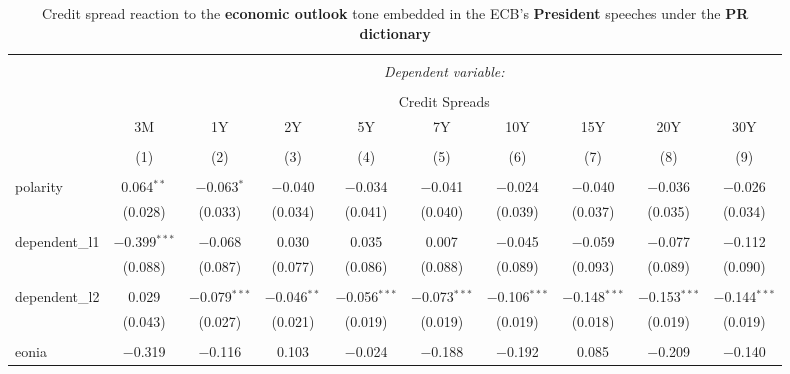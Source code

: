 
\begin{table}[!htbp] \centering 
  \caption[PR Economic Outlook Tone \& Credit Spread: president speeches]{Credit spread reaction to the \textbf{economic outlook} tone embedded in the ECB's \textbf{President} speeches under the \textbf{PR dictionary}} 
  \label{tab:spreads_president_pr_ec} 
  \begin{adjustbox}{width=1.25\textwidth}
\begin{tabular}{@{\extracolsep{5pt}}lccccccccc} 
\\[-1.8ex]\hline 
\hline \\[-1.8ex] 
 & \multicolumn{9}{c}{\textit{Dependent variable:}} \\ 
\cline{2-10} 
\\[-1.8ex] & \multicolumn{9}{c}{Credit Spreads} \\ 
 & 3M & 1Y & 2Y & 5Y & 7Y & 10Y & 15Y & 20Y & 30Y \\ 
\\[-1.8ex] & (1) & (2) & (3) & (4) & (5) & (6) & (7) & (8) & (9)\\ 
\hline \\[-1.8ex] 
 polarity & 0.064$^{**}$ & $-$0.063$^{*}$ & $-$0.040 & $-$0.034 & $-$0.041 & $-$0.024 & $-$0.040 & $-$0.036 & $-$0.026 \\ 
  & (0.028) & (0.033) & (0.034) & (0.041) & (0.040) & (0.039) & (0.037) & (0.035) & (0.034) \\ 
  & & & & & & & & & \\ 
 dependent\_l1 & $-$0.399$^{***}$ & $-$0.068 & 0.030 & 0.035 & 0.007 & $-$0.045 & $-$0.059 & $-$0.077 & $-$0.112 \\ 
  & (0.088) & (0.087) & (0.077) & (0.086) & (0.088) & (0.089) & (0.093) & (0.089) & (0.090) \\ 
  & & & & & & & & & \\ 
 dependent\_l2 & 0.029 & $-$0.079$^{***}$ & $-$0.046$^{**}$ & $-$0.056$^{***}$ & $-$0.073$^{***}$ & $-$0.106$^{***}$ & $-$0.148$^{***}$ & $-$0.153$^{***}$ & $-$0.144$^{***}$ \\ 
  & (0.043) & (0.027) & (0.021) & (0.019) & (0.019) & (0.019) & (0.018) & (0.019) & (0.019) \\ 
  & & & & & & & & & \\ 
 eonia & $-$0.319 & $-$0.116 & 0.103 & $-$0.024 & $-$0.188 & $-$0.192 & 0.085 & $-$0.209 & $-$0.140 \\ 

\end{tabular}
\end{adjustbox}
\end{table}
